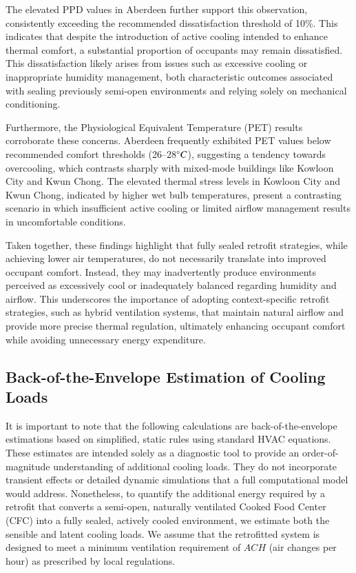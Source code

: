 \documentclass[preprint,12pt]{elsarticle}
\begin{document}
The elevated PPD values in Aberdeen further support this observation, consistently exceeding the recommended dissatisfaction threshold of 10\%. This indicates that despite the introduction of active cooling intended to enhance thermal comfort, a substantial proportion of occupants may remain dissatisfied. This dissatisfaction likely arises from issues such as excessive cooling or inappropriate humidity management, both characteristic outcomes associated with sealing previously semi-open environments and relying solely on mechanical conditioning.

Furthermore, the Physiological Equivalent Temperature (PET) results corroborate these concerns. Aberdeen frequently exhibited PET values below recommended comfort thresholds (26–28$\degree C$), suggesting a tendency towards overcooling, which contrasts sharply with mixed-mode buildings like Kowloon City and Kwun Chong. The elevated thermal stress levels in Kowloon City and Kwun Chong, indicated by higher wet bulb temperatures, present a contrasting scenario in which insufficient active cooling or limited airflow management results in uncomfortable conditions.

Taken together, these findings highlight that fully sealed retrofit strategies, while achieving lower air temperatures, do not necessarily translate into improved occupant comfort. Instead, they may inadvertently produce environments perceived as excessively cool or inadequately balanced regarding humidity and airflow. This underscores the importance of adopting context-specific retrofit strategies, such as hybrid ventilation systems, that maintain natural airflow and provide more precise thermal regulation, ultimately enhancing occupant comfort while avoiding unnecessary energy expenditure.

\subsection{Back-of-the-Envelope Estimation of Cooling Loads}\label{seg:energy}

It is important to note that the following calculations are back-of-the-envelope estimations based on simplified, static rules using standard HVAC equations. These estimates are intended solely as a diagnostic tool to provide an order-of-magnitude understanding of additional cooling loads. They do not incorporate transient effects or detailed dynamic simulations that a full computational model would address. Nonetheless, to quantify the additional energy required by a retrofit that converts a semi-open, naturally ventilated Cooked Food Center (CFC) into a fully sealed, actively cooled environment, we estimate both the sensible and latent cooling loads. We assume that the retrofitted system is designed to meet a minimum ventilation requirement of $ACH$ (air changes per hour) as prescribed by local regulations.
\end{document}
